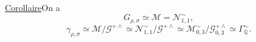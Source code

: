 \uline{Corollaire}\quad On a
\[
G_{\rho,\sigma}\simeq\mathcal M=\mathcal N_{1,1}^{\sim},
\]
\[
\gamma_{\rho,\sigma}\simeq
\mathcal M/\mathcal G^{+\wedge}
\simeq\mathcal N_{1,1}^{\sim}/\mathcal G^{+\wedge}
\simeq\mathcal M_{0,3}^{\sim}/\mathcal G_{0,3}^{+\wedge}
\simeq\Gamma_{\mathbb Q}^{\sim}.
\]




